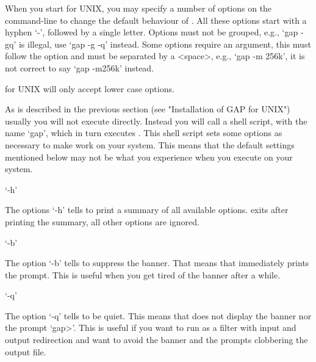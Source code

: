 



When you start {\GAP}  for UNIX, you may  specify a number of  options on
the command-line to change  the default behaviour  of {\GAP}.  All  these
options  start with a  hyphen `-', followed by a  single letter.  Options
must not be   grouped, e.g.,  `gap  -gq' is   illegal, use   `gap -g  -q'
instead.  Some options  require an argument, this  must follow the option
and  must be separated   by a <space>, e.g.,  `gap   -m 256k', it is  not
correct to say `gap -m256k' instead.

{\GAP} for UNIX will only accept lower case options.

As is  described in  the previous section  (see  "Installation of GAP for
UNIX") usually you  will not execute {\GAP}  directly.  Instead  you will
call a shell script, with the name `gap',  which in turn executes {\GAP}.
This shell script sets some options as  necessary to make {\GAP} work on
your  system.  This means that the   default settings mentioned below may
not be what you experience when you execute {\GAP} on your system.

`-h'

The  options  `-h' tells {\GAP}   to print  a   summary of all  available
options.  {\GAP} exits after printing the summary,  all other options are
ignored.

`-b'

The option `-b'  tells {\GAP} to  suppress the banner.  That  means  that
{\GAP} immediately prints the prompt.  This is useful  when you get tired
of the banner after a while.

`-q'

The option  `-q' tells {\GAP} to be  quiet.  This means that  {\GAP} does
not display the banner nor the prompt `gap>'.  This is useful if you want
to run {\GAP} as a filter with  input and output  redirection and want to
avoid the banner and the prompts clobbering the output file.

